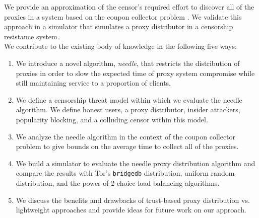 We provide an approximation of the censor's required effort to discover all of the proxies in a system based on the coupon collector problem \cite{flajolet1992birthday}. We validate this approach in a simulator that simulates a proxy distributor in a censorship resistance system. \\

We contribute to the existing body of knowledge in the following five ways:
\begin{enumerate}
    \item We introduce a novel algorithm, \emph{needle}, that restricts the distribution of proxies in order to slow the expected time of proxy system compromise while still maintaining service to a proportion of clients.
    \item We define a censorship threat model within which we evaluate the needle algorithm. We define honest users, a proxy distributor, insider attackers, popularity blocking, and a colluding censor within this model.
    \item We analyze the needle algorithm in the context of the coupon collector problem to give bounds on the average time to collect all of the proxies.
    \item We build a simulator to evaluate the needle proxy distribution algorithm and compare the results with Tor's \texttt{bridgedb} distribution, uniform random distribution, and the power of 2 choice load balancing algorithms. 
    \item We discuss the benefits and drawbacks of trust-based proxy distribution vs. lightweight approaches and provide ideas for future work on our approach.
\end{enumerate}